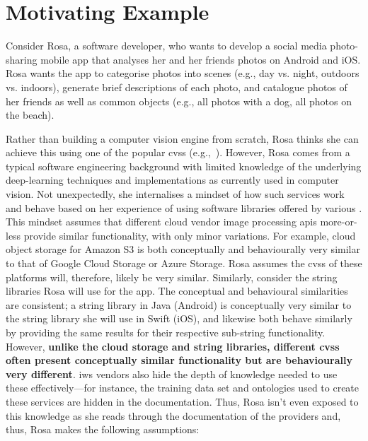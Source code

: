 \section{Motivating Example}
\label{icsme2019:sec:motivating-example}

Consider Rosa, a software developer, who wants to develop a social media photo-sharing mobile app that analyses her and her friends photos on Android and iOS. Rosa wants the app to categorise photos into scenes (e.g., day vs. night, outdoors vs. indoors), generate brief descriptions of each photo, and catalogue photos of her friends as well as common objects (e.g., all photos with a dog, all photos on the beach).

Rather than building a computer vision engine from scratch, Rosa thinks she can achieve this using one of the popular \glspl{cvs} (e.g.,~). However, Rosa comes from a typical software engineering background with limited knowledge of the underlying deep-learning techniques and implementations as currently used in computer vision. Not unexpectedly, she internalises a mindset of how such services work and behave based on her experience of using software libraries offered by various . This mindset assumes that different cloud vendor image processing \glspl{api} more-or-less provide similar functionality, with only minor variations. For example, cloud object storage for Amazon S3 is both conceptually and behaviourally very similar to that of Google Cloud Storage or Azure Storage. Rosa assumes the \glspl{cvs} of these platforms will, therefore, likely be very similar. Similarly, consider the string libraries Rosa will use for the app. The conceptual and behavioural similarities are consistent; a string library in Java (Android) is conceptually very similar to the string library she will use in Swift (iOS), and likewise both behave similarly by providing the same results for their respective sub-string functionality. However, \textbf{unlike the cloud storage and string libraries, different \glspl{cvs} often present conceptually similar functionality but are behaviourally very different}. \Gls{iws} vendors also hide the depth of knowledge needed to use these effectively---for instance, the training data set and ontologies used to create these services are hidden in the documentation. Thus, Rosa isn't even exposed to this knowledge as she reads through the documentation of the providers and, thus, Rosa makes the following assumptions:

